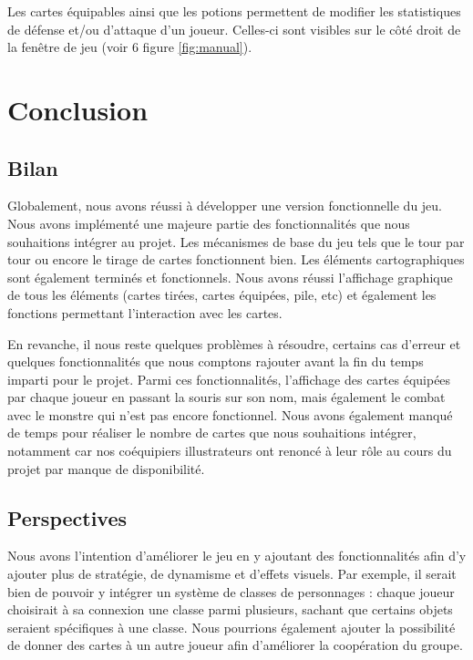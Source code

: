 \documentclass[12pt]{report}
\begin{document}
    Les cartes équipables ainsi que les potions permettent de modifier les statistiques de défense et/ou d'attaque d'un joueur. Celles-ci sont visibles sur le côté droit de la fenêtre de jeu (voir 6 figure \ref{fig:manual}).

\chapter*{Conclusion}

    \section*{Bilan}

    Globalement, nous avons réussi à développer une version fonctionnelle du jeu. Nous avons implémenté une majeure partie des fonctionnalités que nous souhaitions intégrer au projet. Les mécanismes de base du jeu tels que le tour par tour ou encore le tirage de cartes fonctionnent bien. Les éléments cartographiques sont également terminés et fonctionnels. Nous avons réussi l'affichage graphique de tous les éléments (cartes tirées, cartes équipées, pile, etc) et également les fonctions permettant l'interaction avec les cartes.

    En revanche, il nous reste quelques problèmes à résoudre, certains cas d'erreur et quelques fonctionnalités que nous comptons rajouter avant la fin du temps imparti pour le projet. Parmi ces fonctionnalités, l'affichage des cartes équipées par chaque joueur en passant la souris sur son nom, mais également le combat avec le monstre qui n'est pas encore fonctionnel. Nous avons également manqué de temps pour réaliser le nombre de cartes que nous souhaitions intégrer, notamment car nos coéquipiers illustrateurs ont renoncé à leur rôle au cours du projet par manque de disponibilité.

    \section*{Perspectives}

    Nous avons l'intention d'améliorer le jeu en y ajoutant des fonctionnalités afin d'y ajouter plus de stratégie, de dynamisme et d'effets visuels. Par exemple, il serait bien de pouvoir y intégrer un système de classes de personnages : chaque joueur choisirait à sa connexion une classe parmi plusieurs, sachant que certains objets seraient spécifiques à une classe. Nous pourrions également ajouter la possibilité de donner des cartes à un autre joueur afin d'améliorer la coopération du groupe.
\end{document}
